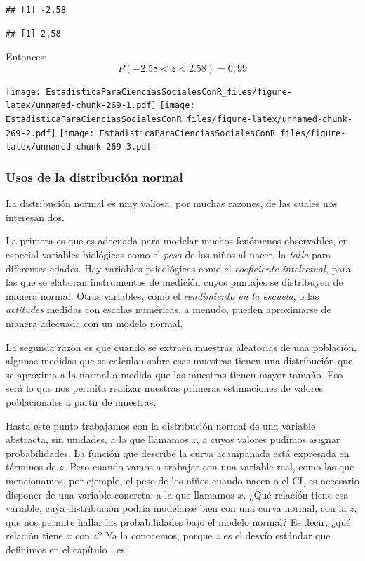 \documentclass[]{book}
\begin{document}
\begin{verbatim}
## [1] -2.58
\end{verbatim}

\begin{verbatim}
## [1] 2.58
\end{verbatim}

Entonces:
\[P(- 2.58 < z < 2.58) = 0,99\]

\texttt{[image: EstadisticaParaCienciasSocialesConR\_files/figure-latex/unnamed-chunk-269-1.pdf]} \texttt{[image: EstadisticaParaCienciasSocialesConR\_files/figure-latex/unnamed-chunk-269-2.pdf]} \texttt{[image: EstadisticaParaCienciasSocialesConR\_files/figure-latex/unnamed-chunk-269-3.pdf]}

\hypertarget{usos-de-la-distribuciuxf3n-normal}{%
\subsubsection{Usos de la distribución normal}\label{usos-de-la-distribuciuxf3n-normal}}

La distribución normal es muy valiosa, por muchas razones, de las cuales nos interesan dos.

La primera es que es adecuada para modelar muchos fenómenos observables,
en especial variables biológicas como el \emph{peso} de los niños al nacer,
la \emph{talla} para diferentes edades. Hay variables psicológicas como el
\emph{coeficiente intelectual}, para las que se elaboran instrumentos de
medición cuyos puntajes se distribuyen de manera normal. Otras
variables, como el \emph{rendimiento en la escuela}, o las \emph{actitudes} medidas con escalas numéricas, a menudo, pueden aproximarse de manera adecuada con un modelo normal.

La segunda razón es que cuando se extraen muestras aleatorias de una
población, algunas medidas que se calculan sobre esas muestras tienen
una distribución que se aproxima a la normal a medida que las muestras
tienen mayor tamaño. Eso será lo que nos permita realizar nuestras
primeras estimaciones de valores poblacionales a partir de muestras.

Hasta este punto trabajamos con la distribución normal de una variable
abstracta, sin unidades, a la que llamamos \(z\), a cuyos valores pudimos
asignar probabilidades. La función que describe la curva acampanada está expresada en términos de \(z\). Pero cuando vamos a trabajar
con una variable real, como las que mencionamos, por ejemplo, el peso de los niños cuando nacen o el CI, es necesario disponer de una variable concreta, a la que llamamos \(x\). ¿Qué relación tiene esa variable, cuya distribución podría modelarse bien con una curva normal, con la \(z\), que nos permite hallar las probabilidades bajo el modelo normal? Es decir, ¿qué relación tiene \(x\) con \(z\)? Ya la conocemos, porque \(z\) es el desvío estándar que definimos en el capítulo , es:
\end{document}

